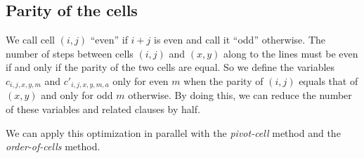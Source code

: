 \documentclass[a4paper]{article}
\begin{document}
\subsection{Parity of the cells}

We call cell $(i,j)$ ``even'' if $i+j$ is even and
call it ``odd'' otherwise.
The number of steps between cells $(i,j)$ and $(x,y)$
along to the lines must be even if and only if
the parity of the two cells are equal.
So we define the variables $c_{i,j,x,y,m}$ and $c'_{i,j,x,y,m,a}$
only for even $m$ when the parity of $(i,j)$ equals that of $(x,y)$
and only for odd $m$ otherwise.
By doing this, we can reduce the number of these variables and
related clauses by half.

We can apply this optimization
in parallel with the \emph{pivot-cell} method
and the \emph{order-of-cells} method.
\end{document}
